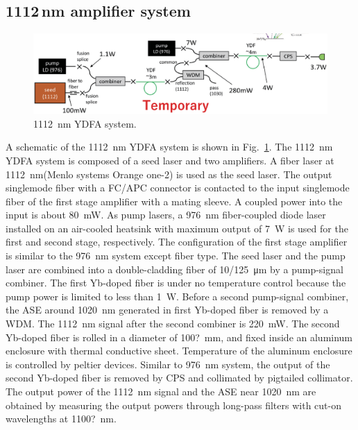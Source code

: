 \documentclass{osa-article}
\begin{document}
\subsection{1112\,nm amplifier system}

\begin{figure}[h!]
  \centering\includegraphics[width=\linewidth]{./Figure/1112nmYDFASystem_Temp.eps}
  \caption{\SI{1112}{\nm} YDFA system.}
  \label{fig:1112YDFASystem}
\end{figure}

A schematic of the \SI{1112}{\nm} YDFA system is shown in Fig.~\ref{fig:1112YDFASystem}.
The \SI{1112}{\nm} YDFA system is composed of a seed laser and two amplifiers.
A fiber laser at \SI{1112}{\nm}(Menlo systems Orange one-2) is used as the seed laser.
The output singlemode fiber with a FC/APC connector is contacted to the input singlemode fiber of the first stage amplifier with a mating sleeve.
A coupled power into the input is about \SI{80}{\mW}.
As pump lasers, a \SI{976}{\nm} fiber-coupled diode laser installed on an air-cooled heatsink with maximum output of \SI{7}{\W} is used for the first and second stage, respectively.
The configuration of the first stage amplifier is similar to the \SI{976}{\nm} system except fiber type.
The seed laser and the pump laser are combined into a double-cladding fiber of \SI{10/125}{\um} by a pump-signal combiner.
The first Yb-doped fiber is under no temperature control because the pump power is limited to less than \SI{1}{\W}.
Before a second pump-signal combiner, the ASE around \SI{1020}{\nm} generated in first Yb-doped fiber is removed by a WDM.
The \SI{1112}{\nm} signal after the second combiner is \SI{220}{\mW}.
The second Yb-doped fiber is rolled in a diameter of \SI{100?}{\mm}, and fixed inside an aluminum enclosure with thermal conductive sheet.
Temperature of the aluminum enclosure is controlled by peltier devices.
Similar to \SI{976}{\nm} system, the output of the second Yb-doped fiber is removed by CPS and collimated by pigtailed collimator.
The output power of the \SI{1112}{\nm} signal and the ASE near \SI{1020}{\nm} are obtained by measuring the output powers through long-pass filters with cut-on wavelengths at \SI{1100?}{\nm}.
\end{document}
